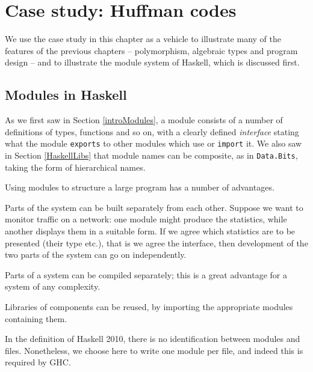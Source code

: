 
\chapter{Case study: Huffman codes}
\chapstart
\label{codes}

We use the case study in this chapter as a vehicle to illustrate many of the
features of the previous chapters -- polymorphism, algebraic types and
program design -- and to illustrate the module system of Haskell,
which is discussed first.


\section{Modules in Haskell}

As we first saw in Section \ref{introModules}, a module
consists of a number of definitions of types, functions and so on, with a
clearly defined \emph{interface} stating what the module \texttt{exports} to
other modules which use or \texttt{import} it. We also saw in Section \ref{HaskellLibs} that module names can be composite, as in \texttt{Data.Bits}, taking the form of hierarchical names.

\medskip
\noindent
Using modules to structure a large program has a number of advantages.
\begin{titemize}
\item Parts of the system can be built separately from each other. Suppose we
want to monitor traffic on a network: one module might produce the statistics,
while another displays them in a suitable form.
If we agree which statistics are to
be presented (their type etc.), that is we agree the interface, then
development of the two parts of the system can go on independently.
\item Parts of a system can be compiled separately; this is a great advantage
for a system of any complexity.
\item Libraries of components can be reused, by importing the appropriate
modules containing them.
\end{titemize}
In the definition of Haskell 2010, there is no identification
between modules and files. Nonetheless, we
choose here to write one module per file, and indeed this is required by GHC.

